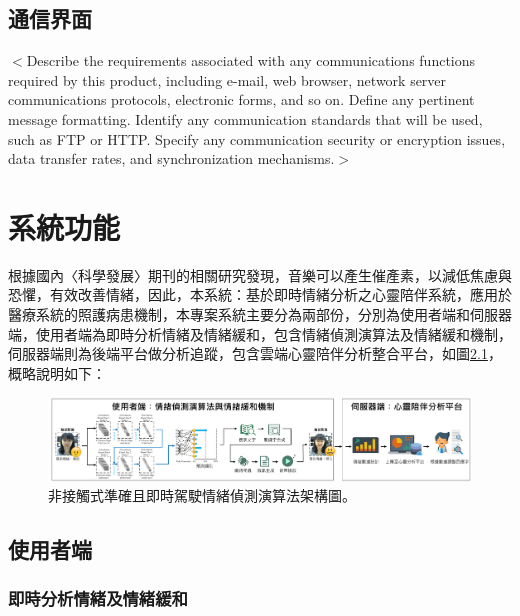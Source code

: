 \documentclass[12pt]{scrreprt}
\begin{document}
\section{通信界面}
$<$Describe the requirements associated with any communications functions 
required by this product, including e-mail, web browser, network server 
communications protocols, electronic forms, and so on. Define any pertinent 
message formatting. Identify any communication standards that will be used, such 
as FTP or HTTP. Specify any communication security or encryption issues, data 
transfer rates, and synchronization mechanisms.$>$


\chapter{系統功能}

根據國內〈科學發展〉期刊的相關研究發現，音樂可以產生催產素，以減低焦慮與恐懼，有效改善情緒，因此，本系統：基於即時情緒分析之心靈陪伴系統，應用於醫療系統的照護病患機制，本專案系統主要分為兩部份，分別為使用者端和伺服器端，使用者端為即時分析情緒及情緒緩和，包含情緒偵測演算法及情緒緩和機制，伺服器端則為後端平台做分析追蹤，包含雲端心靈陪伴分析整合平台，如圖\ref{fig:framework}，概略說明如下：

\begin{figure}[!h]
\begin{center}
\includegraphics[width=1\textwidth]{./figs/framework-version2.pdf}
\end{center}
\caption{非接觸式準確且即時駕駛情緒偵測演算法架構圖。}
\label{fig:framework}
\end{figure}

\section{使用者端}

\subsection{即時分析情緒及情緒緩和}
\end{document}
